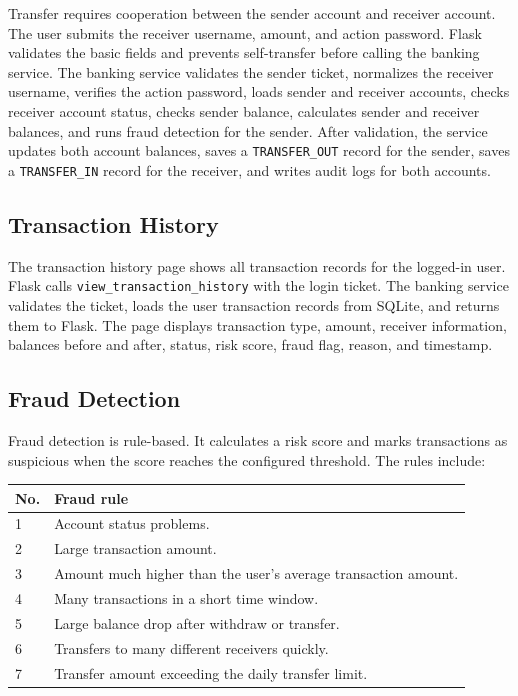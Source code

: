 \documentclass[12pt,a4paper]{article}
\newcommand{\subsectionbreakguard}{\Needspace{5\baselineskip}}
\begin{document}
Transfer requires cooperation between the sender account and receiver account. The user submits the receiver username, amount, and action password. Flask validates the basic fields and prevents self-transfer before calling the banking service. The banking service validates the sender ticket, normalizes the receiver username, verifies the action password, loads sender and receiver accounts, checks receiver account status, checks sender balance, calculates sender and receiver balances, and runs fraud detection for the sender. After validation, the service updates both account balances, saves a \texttt{TRANSFER\_OUT} record for the sender, saves a \texttt{TRANSFER\_IN} record for the receiver, and writes audit logs for both accounts.

\subsectionbreakguard
\subsection{Transaction History}

The transaction history page shows all transaction records for the logged-in user. Flask calls \texttt{view\_transaction\_history} with the login ticket. The banking service validates the ticket, loads the user transaction records from SQLite, and returns them to Flask. The page displays transaction type, amount, receiver information, balances before and after, status, risk score, fraud flag, reason, and timestamp.

\subsectionbreakguard
\subsection{Fraud Detection}

Fraud detection is rule-based. It calculates a risk score and marks transactions as suspicious when the score reaches the configured threshold. The rules include:

\begin{longtable}{|p{1.2cm}|p{12.8cm}|}
\hline
\textbf{No.} & \textbf{Fraud rule} \\
\hline
1 & Account status problems. \\
\hline
2 & Large transaction amount. \\
\hline
3 & Amount much higher than the user's average transaction amount. \\
\hline
4 & Many transactions in a short time window. \\
\hline
5 & Large balance drop after withdraw or transfer. \\
\hline
6 & Transfers to many different receivers quickly. \\
\hline
7 & Transfer amount exceeding the daily transfer limit. \\
\hline
\end{longtable}
\end{document}

